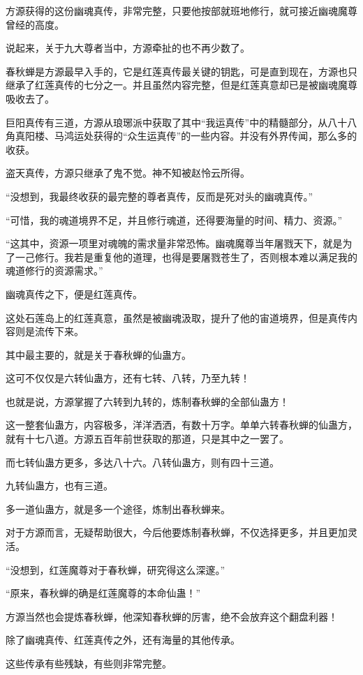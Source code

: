 \begin{this_body}
方源获得的这份幽魂真传，非常完整，只要他按部就班地修行，就可接近幽魂魔尊曾经的高度。

说起来，关于九大尊者当中，方源牵扯的也不再少数了。

春秋蝉是方源最早入手的，它是红莲真传最关键的钥匙，可是直到现在，方源也只继承了红莲真传的七分之一。并且虽然内容完整，但是红莲真意却已是被幽魂魔尊吸收去了。

巨阳真传有三道，方源从琅琊派中获取了其中“我运真传”中的精髓部分，从八十八角真阳楼、马鸿运处获得的“众生运真传”的一些内容。并没有外界传闻，那么多的收获。

盗天真传，方源只继承了鬼不觉。神不知被赵怜云所得。

“没想到，我最终收获的最完整的尊者真传，反而是死对头的幽魂真传。”

“可惜，我的魂道境界不足，并且修行魂道，还得要海量的时间、精力、资源。”

“这其中，资源一项里对魂魄的需求量非常恐怖。幽魂魔尊当年屠戮天下，就是为了一己修行。我若是重复他的道理，也得是要屠戮苍生了，否则根本难以满足我的魂道修行的资源需求。”

幽魂真传之下，便是红莲真传。

这处石莲岛上的红莲真意，虽然是被幽魂汲取，提升了他的宙道境界，但是真传内容则是流传下来。

其中最主要的，就是关于春秋蝉的仙蛊方。

这可不仅仅是六转仙蛊方，还有七转、八转，乃至九转！

也就是说，方源掌握了六转到九转的，炼制春秋蝉的全部仙蛊方！

这一整套仙蛊方，内容极多，洋洋洒洒，有数十万字。单单六转春秋蝉的仙蛊方，就有十七八道。方源五百年前世获取的那道，只是其中之一罢了。

而七转仙蛊方更多，多达八十六。八转仙蛊方，则有四十三道。

九转仙蛊方，也有三道。

多一道仙蛊方，就是多一个途径，炼制出春秋蝉来。

对于方源而言，无疑帮助很大，今后他要炼制春秋蝉，不仅选择更多，并且更加灵活。

“没想到，红莲魔尊对于春秋蝉，研究得这么深邃。”

“原来，春秋蝉的确是红莲魔尊的本命仙蛊！”

方源当然也会提炼春秋蝉，他深知春秋蝉的厉害，绝不会放弃这个翻盘利器！

除了幽魂真传、红莲真传之外，还有海量的其他传承。

这些传承有些残缺，有些则非常完整。


\end{this_body}
